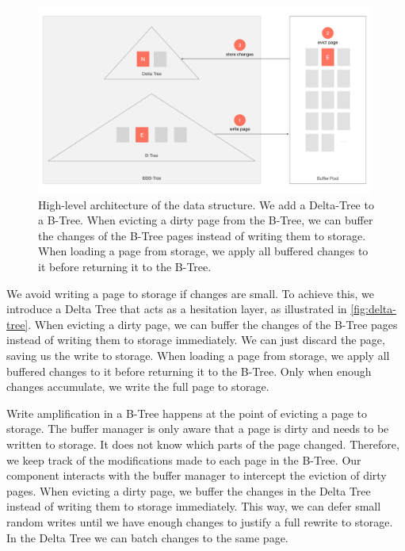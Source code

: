 \begin{figure}[htpb]
  \centering
  \includegraphics[width=0.99\textwidth]{figures/delta_tree.pdf}
  \caption{High-level architecture of the data structure. We add a Delta-Tree to a B-Tree. When evicting a dirty page from the B-Tree, we can buffer the changes of the B-Tree pages instead of writing them to storage. When loading a page from storage, we apply all buffered changes to it before returning it to the B-Tree.}
  \label{fig:delta-tree}
\end{figure}

We avoid writing a page to storage if changes are small.
To achieve this, we introduce a Delta Tree that acts as a hesitation layer, as illustrated in \autoref{fig:delta-tree}.
When evicting a dirty page, we can buffer the changes of the B-Tree pages instead of writing them to storage immediately.
We can just discard the page, saving us the write to storage.
When loading a page from storage, we apply all buffered changes to it before returning it to the B-Tree.
Only when enough changes accumulate, we write the full page to storage.

Write amplification in a B-Tree happens at the point of evicting a page to storage.
The buffer manager is only aware that a page is dirty and needs to be written to storage.
It does not know which parts of the page changed.
Therefore, we keep track of the modifications made to each page in the B-Tree.
Our component interacts with the buffer manager to intercept the eviction of dirty pages.
When evicting a dirty page, we buffer the changes in the Delta Tree instead of writing them to storage immediately.
This way, we can defer small random writes until we have enough changes to justify a full rewrite to storage.
In the Delta Tree we can batch changes to the same page.

